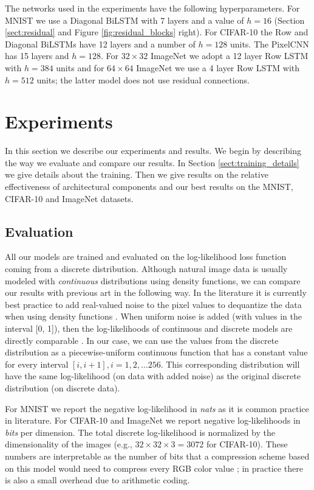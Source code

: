 \documentclass{article}
\begin{document}
The networks used in the experiments have the following hyperparameters. For MNIST we use a Diagonal BiLSTM with 7 layers and a value of $h=16$  (Section \ref{sect:residual} and Figure \ref{fig:residual_blocks} right). For CIFAR-10 the Row and Diagonal BiLSTMs have 12 layers and a number of $h=128$ units. The PixelCNN has 15 layers and $h=128$. For $32\times32$ ImageNet  we adopt a 12 layer Row LSTM with $h=384$ units and for $64\times64$ ImageNet we use a 4 layer Row LSTM with $h=512$ units; the latter model does not use residual connections. 
 


\section{Experiments}
\label{sect:experiments}

In this section we describe our experiments and results.  We begin by describing the way we evaluate and compare our results. In Section \ref{sect:training_details} we give details about the training. Then we give results on the relative effectiveness of architectural components and our best results on the MNIST, CIFAR-10 and ImageNet datasets.

\subsection{Evaluation}

All our models are trained and evaluated on the log-likelihood loss function coming from a discrete distribution.
Although natural image data is usually modeled with \emph{continuous} distributions using density functions, we can compare our results with previous art in the following way. In the literature it is currently best practice to add real-valued noise to the pixel values to dequantize the data when using density functions \cite{uria2013rnade}. When uniform noise is added (with values in the interval [0, 1]), then the log-likelihoods of continuous and discrete models are directly comparable \cite{theis2015note}. In our case, we can use the values from the discrete distribution as a piecewise-uniform continuous function that has a constant value for every interval $[i, i+1], i = 1, 2, \dots 256$. This corresponding distribution will have the same log-likelihood (on data with added noise) as the original discrete distribution (on discrete data). 

For MNIST we report the negative log-likelihood in \emph{nats} as it is common practice in literature. For CIFAR-10 and ImageNet we report negative log-likelihoods in \emph{bits} per dimension. The total discrete log-likelihood is normalized by the dimensionality of the images (e.g., $32\times 32\times 3=3072$ for CIFAR-10). These numbers are interpretable as the number of bits that a compression scheme based on this model would need to compress every RGB color value \mbox{\citep{van2014student, theis2015note}}; in practice there is also a small overhead due to arithmetic coding.
\end{document}
